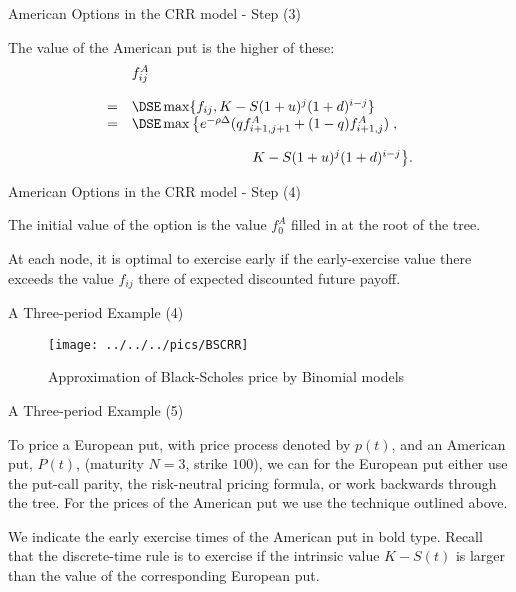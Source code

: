 {American Options in the CRR model - Step (3)}
  \item The value of
the American put is the higher of these:
$$
\begin{array}{ll}
&f^A_{ij} \\*[12pt]=&\DSE \max\{f_{ij}, K - S (1+u)^j (1+d)^{i-j}\}\\
=&\DSE \max\left\{e^{-\rho \Delta} (q f^A_{i+1,j+1} + (1 - q)
f^A_{i+1,j})\right.,\\*[12pt]
&\hspace{3cm} \left. K - S (1+u)^j (1+d)^{i-j}\right\}\!.
\end{array}
$$

{American Options in the CRR model - Step (4)}
\setcounter{enumi}{4}
  \item The initial value of the option is the value $f^A_0$ filled in
at the
root of the tree.
  \item At each node, it is optimal to exercise early if the
early-exercise value there exceeds the value $f_{ij}$ there of
expected discounted future payoff.

{ A Three-period Example (4)}

\begin{figure}[htb]
\begin{center}
  \texttt{[image: ../../../pics/BSCRR]}
\caption{Approximation of Black-Scholes price by Binomial models}
\end{center}\label{BSCRR}
\end{figure}


{ A Three-period Example (5)}

  \item To price a European put, with price process denoted by $p(t)$, and
an American put, $P(t)$, (maturity $N=3$, strike $100$), we can
for the European put either use the put-call parity, the risk-neutral pricing formula, or work
backwards through the tree. For the prices of the American put we
use the technique outlined above.
\item We indicate the early exercise times of the American put in bold
type. Recall that the discrete-time rule is to exercise if the
intrinsic value $K-S(t)$ is larger than the value of the
corresponding European put.

